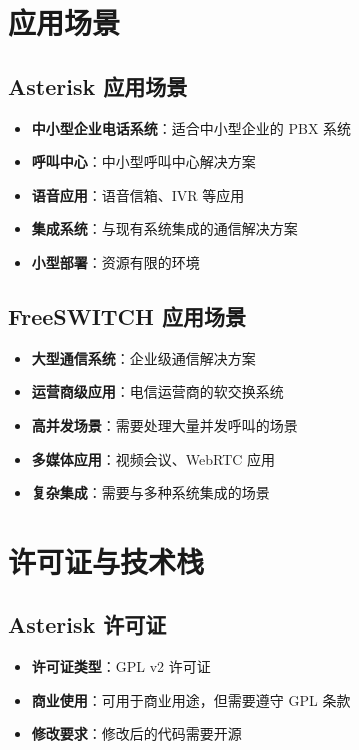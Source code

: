 \documentclass[12pt,UTF8]{ctexbook}
\begin{document}
\chapter{应用场景}
\section{Asterisk 应用场景}

\begin{itemize}
  \item \textbf{中小型企业电话系统}：适合中小型企业的 PBX 系统
  \item \textbf{呼叫中心}：中小型呼叫中心解决方案
  \item \textbf{语音应用}：语音信箱、IVR 等应用
  \item \textbf{集成系统}：与现有系统集成的通信解决方案
  \item \textbf{小型部署}：资源有限的环境
\end{itemize}

\section{FreeSWITCH 应用场景}

\begin{itemize}
  \item \textbf{大型通信系统}：企业级通信解决方案
  \item \textbf{运营商级应用}：电信运营商的软交换系统
  \item \textbf{高并发场景}：需要处理大量并发呼叫的场景
  \item \textbf{多媒体应用}：视频会议、WebRTC 应用
  \item \textbf{复杂集成}：需要与多种系统集成的场景
\end{itemize}

\chapter{许可证与技术栈}
\section{Asterisk 许可证}

\begin{itemize}
  \item \textbf{许可证类型}：GPL v2 许可证
  \item \textbf{商业使用}：可用于商业用途，但需要遵守 GPL 条款
  \item \textbf{修改要求}：修改后的代码需要开源
\end{itemize}
\end{document}
